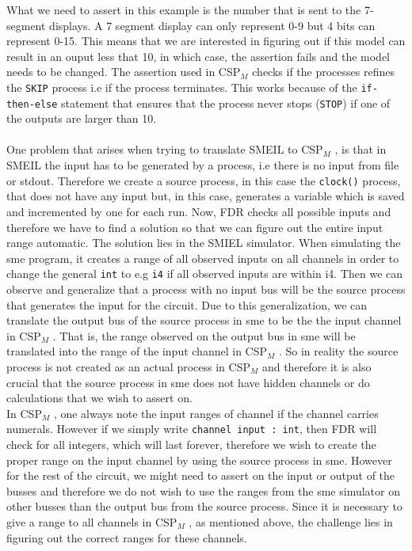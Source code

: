 \documentclass[a4paper]{report}
\newcommand{\cspm}{CSP$_M$ }
\begin{document}
What we need to assert in this example is the number that is sent to the 7-segment displays. A 7 segment display can only represent 0-9 but 4 bits can represent 0-15. This means that we are interested in figuring out if this model can result in an ouput less that 10, in which case, the assertion fails and the model needs to be changed. The assertion used in \cspm checks if the processes refines the \texttt{SKIP} process i.e if the process terminates. This works because of the \texttt{if-then-else} statement that ensures that the process never stops (\texttt{STOP}) if one of the outputs are larger than 10. \\\\
One problem that arises when trying to translate SMEIL to \cspm, is that in SMEIL the input has to be generated by a process, i.e there is no input from file or stdout.
Therefore we create a source process, in this case the \texttt{clock()} process, that does not have any input but, in this case, generates a variable which is saved and incremented by one for each run.
Now, FDR checks all possible inputs and therefore we have to find a solution so that we can figure out the entire input range automatic.
The solution lies in the SMIEL simulator.
When simulating the sme program, it creates a range of all observed inputs on all channels in order to change the general \texttt{int} to e.g \texttt{i4} if all observed inputs are within i4.
Then we can observe and generalize that a process with no input bus will be the source process that generates the input for the circuit.
Due to this generalization, we can translate the output bus of the source process in sme to be the the input channel in \cspm.
That is, the range observed on the output bus in sme will be translated into the range of the input channel in \cspm.
So in reality the source process is not created as an actual process in \cspm and therefore it is also crucial that the source process in sme does not have hidden channels or do calculations that we wish to assert on. \\
In \cspm, one always note the input ranges of channel if the channel carries numerals. However if we simply write \texttt{channel input : int}, then FDR will check for all integers, which will last forever, therefore we wish to create the proper range on the input channel by using the source process in sme.
However for the rest of the circuit, we might need to assert on the input or output of the busses and therefore we do not wish to use the ranges from the sme simulator on other busses than the output bus from the source process.
Since it is necessary to give a range to all channels in \cspm, as mentioned above, the challenge lies in figuring out the correct ranges for these channels. \\
\end{document}

